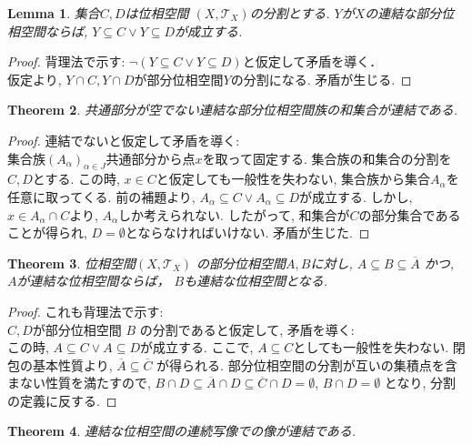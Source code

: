 \documentclass[dvipdfmx]{jbook}
\newcommand{\cl}[1]{\overline{ #1}  }
\newtheorem{theorem}{Theorem}[section]
\newtheorem{lemma}[theorem]{Lemma}
\theoremstyle{remark}
\theoremstyle{plain}
\begin{document}
\begin{lemma}
	集合$C,D$は位相空間 $(X,\mathcal{T}_X)$の分割とする. $Y$が$X$の連結な部分位相空間ならば, $Y \subseteq C \lor Y \subseteq D$が成立する.
\end{lemma}
 
\begin{proof}
	背理法で示す: $ \lnot (Y \subseteq C \lor Y \subseteq D)$と仮定して矛盾を導く．\\
	仮定より, $Y \cap C, Y\cap D$が部分位相空間$Y$の分割になる. 矛盾が生じる.
\end{proof}

\begin{theorem}
	共通部分が空でない連結な部分位相空間族の和集合が連結である.
\end{theorem}

\begin{proof}
	連結でないと仮定して矛盾を導く:\\
	集合族$\left( A_{\alpha} \right) _{\alpha \in J}$共通部分から点$x$を取って固定する.
	集合族の和集合の分割を$C,D$とする.
	この時, $x \in C$と仮定しても一般性を失わない, 集合族から集合$A_{\alpha}$を任意に取ってくる.
	前の補題より, $A_{\alpha} \subseteq C \lor A_{\alpha} \subseteq D$が成立する. 
	しかし, $x \in A_{\alpha} \cap C$より, $A_{\alpha}$しか考えられない. 
	したがって, 和集合が$C$の部分集合であることが得られ, $D = \emptyset$とならなければいけない. 
	矛盾が生じた.
\end{proof}

\begin{theorem}
	位相空間$\left( X , \mathcal{T}_X \right) $ の部分位相空間$A,B$に対し, $A \subseteq B \subseteq \cl{A} $ かつ, $A$が連結な位相空間ならば， $B$も連結な位相空間となる.
\end{theorem}

\begin{proof}
	これも背理法で示す: \\
	$C,D$が部分位相空間 $B$ の分割であると仮定して, 矛盾を導く:\\
	この時,  $A \subseteq C \lor A \subseteq D$が成立する. 
	ここで, $A \subseteq C$としても一般性を失わない.
	閉包の基本性質より, $\cl{A} \subseteq \cl{C}$ が得られる. 
	部分位相空間の分割が互いの集積点を含まない性質を満たすので, 
	$B \cap D \subseteq \cl{A} \cap D \subseteq \cl{C} \cap D = \emptyset$, 
	$B \cap D = \emptyset$ となり, 分割の定義に反する.
\end{proof}

\begin{theorem}
	連結な位相空間の連続写像での像が連結である.
\end{theorem}
\end{document}
